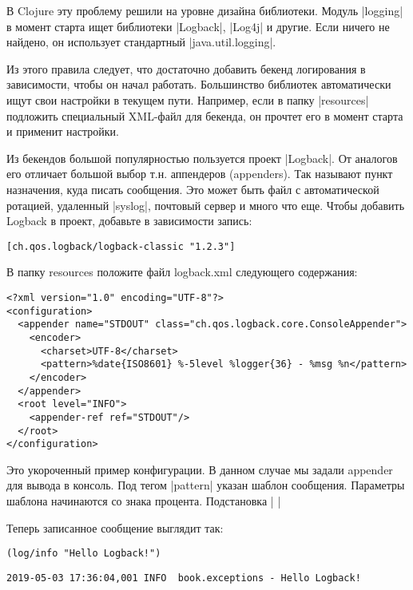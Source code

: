 В Clojure эту проблему решили на уровне дизайна библиотеки. Модуль \spverb|logging| в
момент старта ищет библиотеки \spverb|Logback|, \spverb|Log4j| и другие. Если ничего не
найдено, он использует стандартный \spverb|java.util.logging|.

Из этого правила следует, что достаточно добавить бекенд логирования в
зависимости, чтобы он начал работать. Большинство библиотек автоматически ищут
свои настройки в текущем пути. Например, если в папку \spverb|resources| подложить
специальный XML-файл для бекенда, он прочтет его в момент старта и применит
настройки.

Из бекендов большой популярностью пользуется проект \spverb|Logback|. От аналогов его
отличает большой выбор т.н. аппендеров (appenders). Так называют пункт
назначения, куда писать сообщения. Это может быть файл с автоматической
ротацией, удаленный \spverb|syslog|, почтовый сервер и много что еще. Чтобы добавить
Logback в проект, добавьте в зависимости запись:

\begin{verbatim}
[ch.qos.logback/logback-classic "1.2.3"]
\end{verbatim}

В папку resources положите файл logback.xml следующего содержания:

\begin{verbatim}
<?xml version="1.0" encoding="UTF-8"?>
<configuration>
  <appender name="STDOUT" class="ch.qos.logback.core.ConsoleAppender">
    <encoder>
      <charset>UTF-8</charset>
      <pattern>%date{ISO8601} %-5level %logger{36} - %msg %n</pattern>
    </encoder>
  </appender>
  <root level="INFO">
    <appender-ref ref="STDOUT"/>
  </root>
</configuration>
\end{verbatim}

Это укороченный пример конфигурации. В данном случае мы задали appender для
вывода в консоль. Под тегом \spverb|pattern| указан шаблон сообщения. Параметры шаблона
начинаются со знака процента. Подстановка \spverb|%
\spverb|%

Теперь записанное сообщение выглядит так:

\begin{verbatim}
(log/info "Hello Logback!")
\end{verbatim}

\begin{verbatim}
2019-05-03 17:36:04,001 INFO  book.exceptions - Hello Logback!
\end{verbatim}

